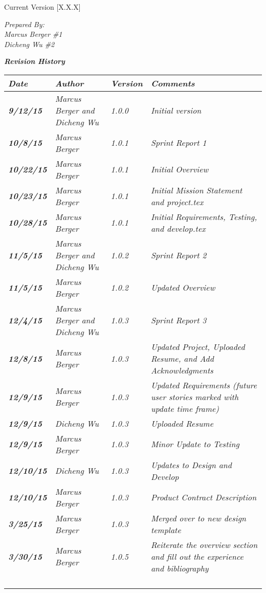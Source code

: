 


Current Version [X.X.X]
\vspace*{5mm}

{\color{SDColor5}
\noindent
\textit{Prepared By:}\\
\textit{Marcus Berger \#1}\\
\textit{Dicheng Wu \#2}\\
}

\vfill
\noindent
{\color{SDColor3} \textit{\textbf{Revision History}}}\\
\begin{tabular}{|>{\raggedright}p{1.5cm}|>{\raggedright}p{3cm}|>{\raggedright}p{1.5cm}|>{\raggedright}p{9cm}|}
\hline
\textit{\textbf{Date}} &  \textit{\textbf{Author}} & \textit{\textbf{Version}} & \textit{\textbf{Comments}}\tabularnewline
\hline
 \textit{\textbf{9/12/15}} & \textit{Marcus Berger and Dicheng Wu} & \textit{1.0.0} & \textit{Initial version}\tabularnewline
\hline
\textit{\textbf{10/8/15}} & \textit{Marcus Berger} & \textit{1.0.1} & \textit{Sprint Report 1}\tabularnewline
\hline
\textit{\textbf{10/22/15}} & \textit{Marcus Berger} & \textit{1.0.1} & \textit{Initial Overview}\tabularnewline
\hline
\textit{\textbf{10/23/15}} & \textit{Marcus Berger} & \textit{1.0.1} & \textit{Initial Mission Statement and project.tex}\tabularnewline
\hline
\textit{\textbf{10/28/15}} & \textit{Marcus Berger} & \textit{1.0.1} & \textit{Initial Requirements, Testing, and develop.tex }\tabularnewline
\hline
\textit{\textbf{11/5/15}} & \textit{Marcus Berger and Dicheng Wu} & \textit{1.0.2} & \textit{Sprint Report 2}\tabularnewline
\hline
\textit{\textbf{11/5/15}} & \textit{Marcus Berger} & \textit{1.0.2} & \textit{Updated Overview}\tabularnewline
\hline
\textit{\textbf{12/4/15}} & \textit{Marcus Berger and Dicheng Wu} & \textit{1.0.3} & \textit{Sprint Report 3}\tabularnewline
\hline
\textit{\textbf{12/8/15}} & \textit{Marcus Berger} & \textit{1.0.3} & \textit{Updated Project, Uploaded Resume, and Add Acknowledgments}\tabularnewline
\hline
\textit{\textbf{12/9/15}} & \textit{Marcus Berger} & \textit{1.0.3} & \textit{Updated Requirements (future user stories marked with update time frame) }\tabularnewline
\hline
\textit{\textbf{12/9/15}} & \textit{Dicheng Wu} & \textit{1.0.3} & \textit{Uploaded Resume}\tabularnewline
\hline
\textit{\textbf{12/9/15}} & \textit{Marcus Berger} & \textit{1.0.3} & \textit{Minor Update to Testing}\tabularnewline
\hline
\textit{\textbf{12/10/15}} & \textit{Dicheng Wu} & \textit{1.0.3} & \textit{Updates to Design and Develop}\tabularnewline
\hline
\textit{\textbf{12/10/15}} & \textit{Marcus Berger} & \textit{1.0.3} & \textit{Product Contract Description}\tabularnewline
\hline
\textit{\textbf{3/25/15}} & \textit{Marcus Berger} & \textit{1.0.3} & \textit{Merged over to new design template}\tabularnewline
\hline
\textit{\textbf{3/30/15}} & \textit{Marcus Berger} & \textit{1.0.5} & \textit{Reiterate the overview section and fill out the experience and bibliography}\tabularnewline
\hline
 &  &  & \tabularnewline
\hline
 &  &  & \tabularnewline
\hline
 &  &  & \tabularnewline
\hline
 &  &  & \tabularnewline
\hline
\end{tabular}
\vfill

